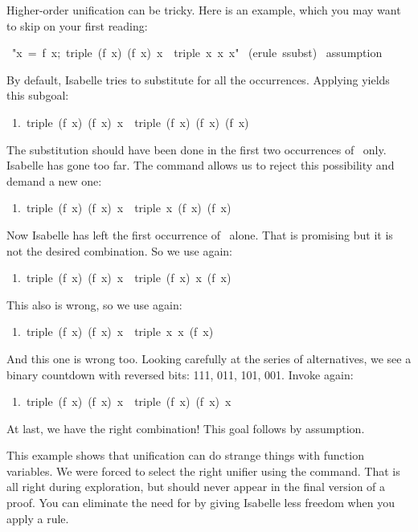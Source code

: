 Higher-order unification can be tricky.  Here is an example, which you may
want to skip on your first reading:
\begin{isabelle}
\ "\isasymlbrakk x\ =\
f\ x;\ triple\ (f\ x)\ (f\ x)\ x\isasymrbrakk\
\isasymLongrightarrow\ triple\ x\ x\ x"\isanewline
\isacommand{apply}\ (erule\ ssubst)\isanewline
{}\isanewline
{}\isanewline
\isacommand{back}\isanewline
\isacommand{back}\isanewline
{}\ assumption\isanewline
\isacommand{done}
\end{isabelle}
%
By default, Isabelle tries to substitute for all the 
occurrences.  Applying  yields this subgoal:
\begin{isabelle}
\ 1.\ triple\ (f\ x)\ (f\ x)\ x\ \isasymLongrightarrow\ triple\ (f\ x)\ (f\ x)\ (f\ x)
\end{isabelle}
The substitution should have been done in the first two occurrences 
of~\isa{x} only. Isabelle has gone too far. The 
command allows us to reject this possibility and demand a new one: 
\begin{isabelle}
\ 1.\ triple\ (f\ x)\ (f\ x)\ x\ \isasymLongrightarrow\ triple\ x\ (f\ x)\ (f\ x)
\end{isabelle}
%
Now Isabelle has left the first occurrence of~ alone. That is 
promising but it is not the desired combination. So we use  
again:
\begin{isabelle}
\ 1.\ triple\ (f\ x)\ (f\ x)\ x\ \isasymLongrightarrow\ triple\ (f\ x)\ x\ (f\ x)
\end{isabelle}
%
This also is wrong, so we use  again: 
\begin{isabelle}
\ 1.\ triple\ (f\ x)\ (f\ x)\ x\ \isasymLongrightarrow\ triple\ x\ x\ (f\ x)
\end{isabelle}
%
And this one is wrong too. Looking carefully at the series 
of alternatives, we see a binary countdown with reversed bits: 111,
011, 101, 001.  Invoke \isacommand{back} again: 
\begin{isabelle}
\ 1.\ triple\ (f\ x)\ (f\ x)\ x\ \isasymLongrightarrow\ triple\ (f\ x)\ (f\ x)\ x%
\end{isabelle}
At last, we have the right combination!  This goal follows by assumption.%

\medskip
This example shows that unification can do strange things with
function variables.  We were forced to select the right unifier using the
 command.  That is all right during exploration, but \isacommand{back}
should never appear in the final version of a proof.  You can eliminate the
need for \isacommand{back} by giving Isabelle less freedom when you apply a rule.


